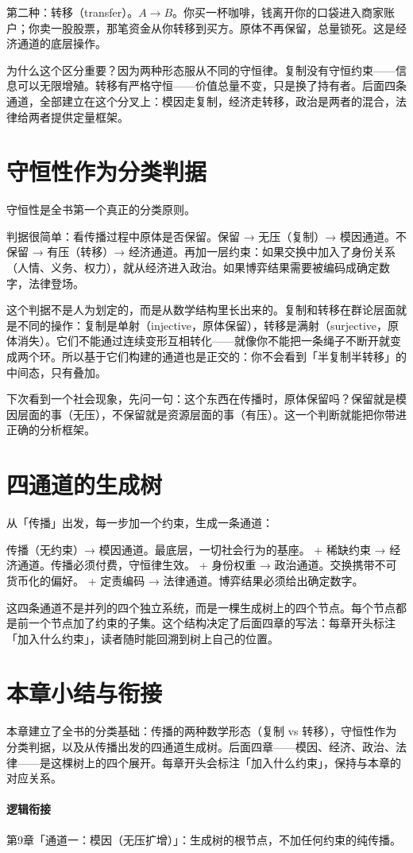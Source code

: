 \documentclass[../../main2.tex]{subfiles}
\begin{document}
	第二种：转移（transfer）。$A \to B$。你买一杯咖啡，钱离开你的口袋进入商家账户；你卖一股股票，那笔资金从你转移到买方。原体不再保留，总量锁死。这是经济通道的底层操作。

	为什么这个区分重要？因为两种形态服从不同的守恒律。复制没有守恒约束——信息可以无限增殖。转移有严格守恒——价值总量不变，只是换了持有者。后面四条通道，全部建立在这个分叉上：模因走复制，经济走转移，政治是两者的混合，法律给两者提供定量框架。
	\section{守恒性作为分类判据}
	守恒性是全书第一个真正的分类原则。

	判据很简单：看传播过程中原体是否保留。保留 → 无压（复制）→ 模因通道。不保留 → 有压（转移）→ 经济通道。再加一层约束：如果交换中加入了身份关系（人情、义务、权力），就从经济进入政治。如果博弈结果需要被编码成确定数字，法律登场。

	这个判据不是人为划定的，而是从数学结构里长出来的。复制和转移在群论层面就是不同的操作：复制是单射（injective，原体保留），转移是满射（surjective，原体消失）。它们不能通过连续变形互相转化——就像你不能把一条绳子不断开就变成两个环。所以基于它们构建的通道也是正交的：你不会看到「半复制半转移」的中间态，只有叠加。

	\begin{readingnote}
		下次看到一个社会现象，先问一句：这个东西在传播时，原体保留吗？保留就是模因层面的事（无压），不保留就是资源层面的事（有压）。这一个判断就能把你带进正确的分析框架。
	\end{readingnote}
	\section{四通道的生成树}
	从「传播」出发，每一步加一个约束，生成一条通道：

	传播（无约束）→ 模因通道。最底层，一切社会行为的基座。
	+ 稀缺约束 → 经济通道。传播必须付费，守恒律生效。
	+ 身份权重 → 政治通道。交换携带不可货币化的偏好。
	+ 定责编码 → 法律通道。博弈结果必须给出确定数字。

	这四条通道不是并列的四个独立系统，而是一棵生成树上的四个节点。每个节点都是前一个节点加了约束的子集。这个结构决定了后面四章的写法：每章开头标注「加入什么约束」，读者随时能回溯到树上自己的位置。
	\section{本章小结与衔接}
	本章建立了全书的分类基础：传播的两种数学形态（复制 vs 转移），守恒性作为分类判据，以及从传播出发的四通道生成树。后面四章——模因、经济、政治、法律——是这棵树上的四个展开。每章开头会标注「加入什么约束」，保持与本章的对应关系。

	\paragraph*{逻辑衔接}
	第9章「通道一：模因（无压扩增）」：生成树的根节点，不加任何约束的纯传播。
\end{document}
